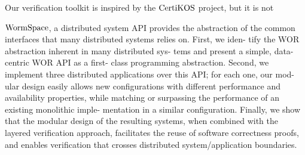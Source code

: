Our verification toolkit is inspired by the $\mathrm{CertiKOS}$ project,
but it is not 

$\mathrm{WormSpace}$, a distributed system API provides the abstraction of the common 
interfaces that  many distributed systems relies on. 
First, we iden- tify the WOR abstraction inherent in many distributed sys- tems and present a simple, data-centric WOR API as a first- class programming abstraction. Second, we implement three distributed applications over this API; for each one, our mod- ular design easily allows new configurations with different performance and availability properties, while matching or surpassing the performance of an existing monolithic imple- mentation in a similar configuration. Finally, we show that the modular design of the resulting systems, when combined with the layered verification approach, facilitates the reuse of software correctness proofs, and enables verification that crosses distributed system/application boundaries.


